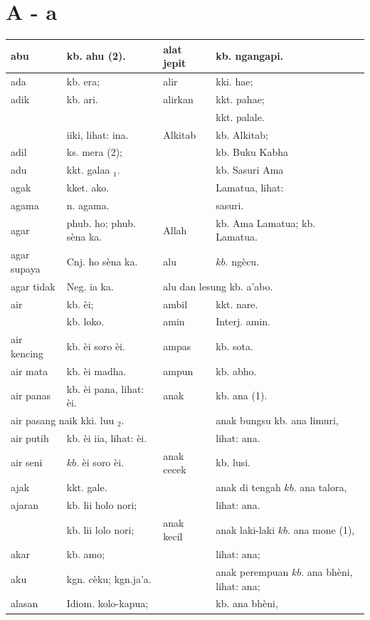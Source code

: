 \documentclass[10pt]{article}
\begin{document}
\captionsetup{singlelinecheck=false}
\section*{A - a}
\begin{center}
\begin{tabular}{|l|l|l|l|}
\hline
abu & kb. ahu (2). & alat jepit & kb. ngangapi. \\
\hline
ada & kb. era; & alir & kki. hae; \\
\hline
adik & kb. ari. & alirkan & kkt. pahae; \\
\hline
\multicolumn{2}{|c|}{} &  & kkt. palale. \\
\hline
 & iiki, lihat: ina. & Alkitab & kb. Alkitab; \\
\hline
adil & ks. mera (2); &  & kb. Buku Kabha \\
\hline
adu & kkt. galaa \({ }_{1}\). &  & kb. Sasuri Ama \\
\hline
agak & kket. ako. &  & Lamatua, lihat: \\
\hline
agama & n. agama. &  & sasuri. \\
\hline
agar & phub. ho; phub. sèna ka. & Allah & kb. Ama Lamatua; kb. Lamatua. \\
\hline
agar supaya & Cnj. ho sèna ka. & alu & \(k b\). ngècu. \\
\hline
agar tidak & Neg. ia ka. & \multicolumn{2}{|l|}{alu dan lesung kb. a'abo.} \\
\hline
air & kb. èi; & ambil & kkt. nare. \\
\hline
 & kb. loko. & amin & Interj. amin. \\
\hline
air kencing & kb. èi soro èi. & ampas & kb. sota. \\
\hline
air mata & kb. èi madha. & ampun & kb. abho. \\
\hline
air panas & kb. èi pana, lihat: èi. & anak & kb. ana (1). \\
\hline
\multicolumn{2}{|l|}{air pasang naik kki. luu \({ }_{2}\).} &  & anak bungsu kb. ana limuri, \\
\hline
air putih & kb. èi iia, lihat: èi. &  & lihat: ana. \\
\hline
air seni & \(k b\). èi soro èi. & anak cecek & kb. lusi. \\
\hline
ajak & kkt. gale. &  & anak di tengah \(k b\). ana talora, \\
\hline
ajaran & kb. lii holo nori; &  & lihat: ana. \\
\hline
 & kb. lii lolo nori; & anak kecil & anak laki-laki \(k b\). ana mone (1), \\
\hline
akar & kb. amo; &  & lihat: ana; \\
\hline
aku & kgn. cèku; kgn.ja'a. &  & anak perempuan \(k b\). ana bhèni, lihat: ana; \\
\hline
alasan & Idiom. kolo-kapua; &  & kb. ana bhèni, \\
\hline
\end{tabular}
\end{center}
\end{document}
